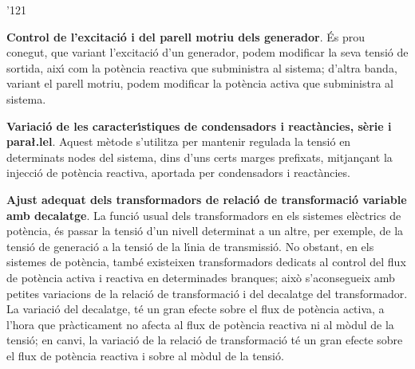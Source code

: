 \begin{dinglist}{'121}
   \item \textbf{Control de l'excitaci\'{o} i del parell motriu dels generador}. \'{E}s prou conegut,
    que variant l'excitaci\'{o} d'un generador, podem modificar la seva tensi\'{o} de sortida, aix\'{\i} com
    la pot\`{e}ncia reactiva que subministra al sistema; d'altra banda, variant el parell motriu,
    podem modificar la pot\`{e}ncia activa que subministra al sistema.
   \item \textbf{Variaci\'{o} de les caracter\'{\i}stiques de condensadors i react\`{a}ncies, s\`{e}rie
    i para{\l.l}el}. Aquest m\`{e}tode s'utilitza per mantenir regulada la tensi\'{o} en determinats
     nodes del sistema, dins d'uns certs marges prefixats, mitjan\c{c}ant la injecci\'{o}  de pot\`{e}ncia
      reactiva, aportada per condensadors i react\`{a}ncies.
   \item \textbf{Ajust adequat dels transformadors de relaci\'{o} de transformaci\'{o} variable amb
    decalatge}. La funci\'{o} usual dels transformadors en els sistemes el\`{e}ctrics de pot\`{e}ncia,
    \'{e}s passar la tensi\'{o} d'un nivell determinat a un altre, per exemple, de la tensi\'{o} de generaci\'{o}
    a la tensi\'{o} de la l\'{\i}nia de transmissi\'{o}. No obstant, en els sistemes de pot\`{e}ncia, tamb\'{e} existeixen
    transformadors dedicats al control del flux de pot\`{e}ncia activa i reactiva en determinades
    branques; aix\`{o} s'aconsegueix amb petites variacions de la relaci\'{o} de transformaci\'{o} i del
    decalatge del transformador. La variaci\'{o} del decalatge, t\'{e} un gran efecte sobre el flux
    de pot\`{e}ncia activa, a l'hora que pr\`{a}cticament no afecta al flux de pot\`{e}ncia reactiva ni al
    m\`{o}dul de la tensi\'{o}; en canvi, la variaci\'{o} de la relaci\'{o} de transformaci\'{o} t\'{e} un gran efecte
    sobre el flux de pot\`{e}ncia reactiva i sobre al m\`{o}dul de la tensi\'{o}.
\end{dinglist}
